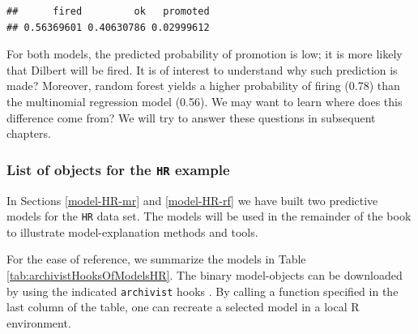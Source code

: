 \documentclass[12pt,]{krantz}
\theoremstyle{definition}
\theoremstyle{definition}
\theoremstyle{definition}
\theoremstyle{remark}
\begin{document}
\begin{verbatim}
##      fired         ok   promoted 
## 0.56369601 0.40630786 0.02999612
\end{verbatim}

For both models, the predicted probability of promotion is low; it is
more likely that Dilbert will be fired. It is of interest to understand
why such prediction is made? Moreover, random forest yields a higher
probability of firing (0.78) than the multinomial regression model
(0.56). We may want to learn where does this difference come from? We
will try to answer these questions in subsequent chapters.

\hypertarget{ListOfModelsHR}{%
\subsubsection{\texorpdfstring{List of objects for the \texttt{HR}
example}{List of objects for the HR example}}\label{ListOfModelsHR}}

In Sections \ref{model-HR-mr} and \ref{model-HR-rf} we have built two
predictive models for the \texttt{HR} data set. The models will be used
in the remainder of the book to illustrate model-explanation methods and
tools.

For the ease of reference, we summarize the models in Table
\ref{tab:archivistHooksOfModelsHR}. The binary model-objects can be
downloaded by using the indicated \texttt{archivist} hooks
\citep{archivist}. By calling a function specified in the last column of
the table, one can recreate a selected model in a local R environment.
\end{document}
